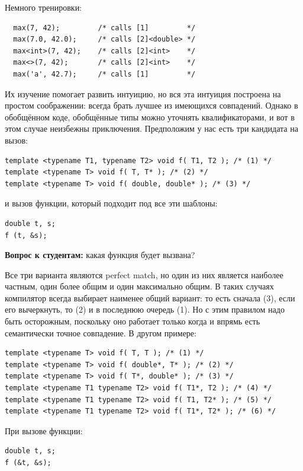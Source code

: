 \documentclass[a4paper,12pt,oneside]{article}
\newif\ifanswers
\begin{document}
Немного тренировки:

\begin{lstlisting}
  max(7, 42);         /* calls [1]         */
  max(7.0, 42.0);     /* calls [2]<double> */
  max<int>(7, 42);    /* calls [2]<int>    */
  max<>(7, 42);       /* calls [2]<int>    */
  max('a', 42.7);     /* calls [1]         */
\end{lstlisting}

Их изучение помогает развить интуицию, но вся эта интуиция построена на простом соображении: всегда брать лучшее из имеющихся совпадений. Однако в обобщённом коде, обобщённые типы можно уточнять квалификаторами, и вот в этом случае неизбежны приключения. Предположим у нас есть три кандидата на вызов:

\begin{lstlisting}
template <typename T1, typename T2> void f( T1, T2 ); /* (1) */
template <typename T> void f( T, T* ); /* (2) */
template <typename T> void f( double, double* ); /* (3) */
\end{lstlisting}

и вызов функции, который подходит под все эти шаблоны:

\begin{lstlisting}
double t, s;
f (t, &s);
\end{lstlisting}

\textbf{Вопрос к студентам:} какая функция будет вызвана?

\ifanswers
Все три варианта являются perfect match, но один из них является наиболее частным, один более общим и один максимально общим. В таких случаях компилятор всегда выбирает наименее общий вариант: то есть сначала (3), если  его вычеркнуть, то (2) и в последнюю очередь (1). Но с этим правилом надо быть осторожным, поскольку оно работает только когда и впрямь есть семантически точное совпадение. В другом примере:

\begin{lstlisting}
template <typename T> void f( T, T ); /* (1) */
template <typename T> void f( double*, T* ); /* (2) */
template <typename T> void f( T*, double* ); /* (3) */
template <typename T1 typename T2> void f( T1*, T2 ); /* (4) */
template <typename T1 typename T2> void f( T1, T2* ); /* (5) */
template <typename T1 typename T2> void f( T1*, T2* ); /* (6) */
\end{lstlisting}

При вызове функции:

\begin{lstlisting}
double t, s;
f (&t, &s);
\end{lstlisting}
\end{document}
